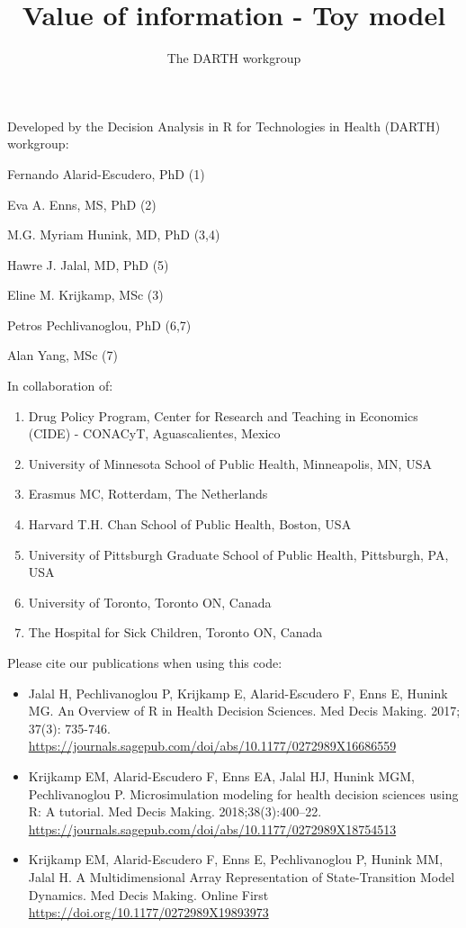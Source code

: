 \documentclass[
]{article}
\title{Value of information - Toy model}
\author{The DARTH workgroup}
\date{}
\providecommand{\tightlist}{%
  \setlength{\itemsep}{0pt}\setlength{\parskip}{0pt}}
\begin{document}
\maketitle

Developed by the Decision Analysis in R for Technologies in Health
(DARTH) workgroup:

Fernando Alarid-Escudero, PhD (1)

Eva A. Enns, MS, PhD (2)

M.G. Myriam Hunink, MD, PhD (3,4)

Hawre J. Jalal, MD, PhD (5)

Eline M. Krijkamp, MSc (3)

Petros Pechlivanoglou, PhD (6,7)

Alan Yang, MSc (7)

In collaboration of:

\begin{enumerate}
\def\labelenumi{\arabic{enumi}.}
\tightlist
\item
  Drug Policy Program, Center for Research and Teaching in Economics
  (CIDE) - CONACyT, Aguascalientes, Mexico
\item
  University of Minnesota School of Public Health, Minneapolis, MN, USA
\item
  Erasmus MC, Rotterdam, The Netherlands
\item
  Harvard T.H. Chan School of Public Health, Boston, USA
\item
  University of Pittsburgh Graduate School of Public Health, Pittsburgh,
  PA, USA
\item
  University of Toronto, Toronto ON, Canada
\item
  The Hospital for Sick Children, Toronto ON, Canada
\end{enumerate}

Please cite our publications when using this code:

\begin{itemize}
\item
  Jalal H, Pechlivanoglou P, Krijkamp E, Alarid-Escudero F, Enns E,
  Hunink MG. An Overview of R in Health Decision Sciences. Med Decis
  Making. 2017; 37(3): 735-746.
  \url{https://journals.sagepub.com/doi/abs/10.1177/0272989X16686559}
\item
  Krijkamp EM, Alarid-Escudero F, Enns EA, Jalal HJ, Hunink MGM,
  Pechlivanoglou P. Microsimulation modeling for health decision
  sciences using R: A tutorial. Med Decis Making. 2018;38(3):400--22.
  \url{https://journals.sagepub.com/doi/abs/10.1177/0272989X18754513}
\item
  Krijkamp EM, Alarid-Escudero F, Enns E, Pechlivanoglou P, Hunink MM,
  Jalal H. A Multidimensional Array Representation of State-Transition
  Model Dynamics. Med Decis Making. Online First
  \url{https://doi.org/10.1177/0272989X19893973}
\end{itemize}
\end{document}
